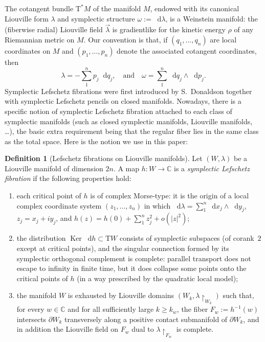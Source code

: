 \documentclass[JEP,XML,SOM,Unicode]{cedram}
\newcommand{\C}{{\mathbb C}}
\newcommand{\Ker}{\operatorname{Ker}}
\newcommand{\etc}{,\ldots,}
\newcommand{\sT}{\mathrm{T}^\ast}
\newcommand{\rT}{\mathrm{T}}
\renewcommand{\d}{\mathop{}\!\mathrm d}
\newcommand{\dlambda}{\d\lambda}
\renewcommand{\dh}{\d h}
\newcommand{\dq}{\d q}
\newcommand{\dx}{\d x}
\newcommand{\dy}{\d y}
\newcommand{\de}{\mathrel{:=}}
\newcommand{\rst}[1]{{\upharpoonright}_{\!#1}}
\let\del\partial
\let\on\colon
\theoremstyle{plain}
\theoremstyle{definition}
\newtheorem{definition}[theorem]{Definition}
\begin{document}
The cotangent bundle $\sT M$ of the manifold $M$, endowed with its canonical
Liouville form $\lambda$ and symplectic structure $\omega \de \dlambda$, is a
Weinstein manifold: the (fiberwise radial) Liouville field $\vec\lambda$ is
gradientlike for the kinetic energy $\rho$ of any Riemannian metric on $M$. Our
convention is that, if $(q_1 \etc q_n)$ are local coordinates on $M$ and $(p_1
\etc p_n)$ denote the associated cotangent coordinates, then
\[
\lambda = - \sum_1^n p_j \dq_j, \quad \text{and} \quad
 \omega = \sum_1^n \dq_j \wedge \d p_j.
\]
Symplectic Lefschetz fibrations were first introduced by S.~Donaldson \cite{Do}
together with symplectic Lefschetz pencils on closed manifolds. Nowadays, there
is a specific notion of symplectic Lefschetz fibration attached to each class of
symplectic manifolds (such as closed symplectic manifolds, Liouville manifolds,
\ldots), the basic extra requirement being that the regular fiber lies in the
same class as the total space. Here is the notion we use in this paper:

\begin{definition}[Lefschetz fibrations on Liouville manifolds] \label{d:slf}
Let $(W,\lambda)$ be a Liouville manifold of dimension $2n$. A map $h \on W \to
\C$ is a \emph{symplectic Lefschetz fibration} if the following properties hold:
\begin{enumerate}
\item\label{up1}
each critical point of $h$ is of complex Morse-type: it is the origin of a local
complex coordinate system $(z_1 \etc z_n)$ in which $\dlambda = \sum_1^n \dx_j
\wedge \dy_j$, $z_j = x_j+iy_j$, and $h(z) = h(0) + \sum_1^n z_j^2 + o(|z|^2)$;
\item\label{up2}
the distribution $\Ker\dh \subset \rT W$ consists of symplectic subspaces (of
corank~$2$ except at critical points), and the singular connection formed by its
symplectic orthogonal complement is complete: parallel transport does not escape
to infinity in finite time, but it does collapse some points onto the critical
points of $h$ (in a way prescribed by the quadratic local model);
\item\label{up3}
the manifold $W$ is exhausted by Liouville domains $(W_k, \lambda \rst{ W_k })$
such that, for every $w \in \C$ and for all sufficiently large $k \ge k_w$, the
fiber $F_w \de h^{-1}(w)$ intersects $\del W_k$ transversely along a positive
contact submanifold of $\del W_k$, and in addition the Liouville field on $F_w$
dual to $\lambda \rst{ F_w }$ is complete.
\end{enumerate}
\end{definition}
\end{document}
